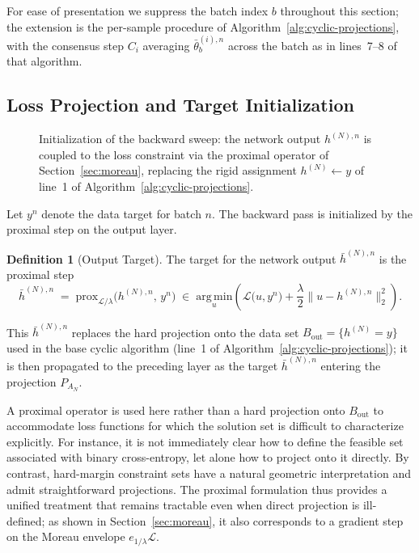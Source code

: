 \documentclass{article}
\theoremstyle{plain}
\theoremstyle{definition}
\newtheorem{definition}[theorem]{Definition}
\theoremstyle{remark}
\begin{document}
For ease of presentation we suppress the batch index $b$ throughout this section; the
extension is the per-sample procedure of Algorithm~\ref{alg:cyclic-projections}, with the
consensus step $C_i$ averaging $\bar{\theta}^{(i),n}_b$ across the batch as in
lines~7--8 of that algorithm.
 
\subsection{Loss Projection and Target Initialization}
 
\begin{figure}[htbp]
\centering
\resizebox{\textwidth}{!}{%

}
\caption{Initialization of the backward sweep: the network output $h^{(N),n}$ is coupled to
the loss constraint via the proximal operator of Section~\ref{sec:moreau}, replacing the
rigid assignment $h^{(N)} \leftarrow y$ of line~1 of Algorithm~\ref{alg:cyclic-projections}.}
\label{fig:init_back_prop}
\end{figure}
 
Let $y^{n}$ denote the data target for batch $n$. The backward pass is initialized by the
proximal step on the output layer.
 
\begin{definition}[Output Target]
\label{def:output-target}
The target for the network output $\bar{h}^{(N),n}$ is the proximal step
\begin{equation}
\bar{h}^{(N),n} \;=\; \mathrm{prox}_{\mathcal{L}/\lambda}\!\bigl(h^{(N),n},\, y^{n}\bigr)
\;\in\; \underset{u}{\mathrm{arg\,min}}
\left( \mathcal{L}\bigl(u, y^{n}\bigr) + \frac{\lambda}{2}
       \bigl\|u - h^{(N),n}\bigr\|_2^2 \right).
\end{equation}
\end{definition}
 
This $\bar{h}^{(N),n}$ replaces the hard projection onto the data set
$B_{\mathrm{out}} = \{h^{(N)} = y\}$ used in the base cyclic algorithm (line~1 of
Algorithm~\ref{alg:cyclic-projections}); it is then propagated to the preceding layer as the
target $\bar{h}^{(N),n}$ entering the projection $P_{A_{N}}$.
 
A proximal operator is used here rather than a hard projection onto $B_{\mathrm{out}}$ to
accommodate loss functions for which the solution set is difficult to characterize
explicitly. For instance, it is not immediately clear how to define the feasible set
associated with binary cross-entropy, let alone how to project onto it directly. By
contrast, hard-margin constraint sets have a natural geometric interpretation and admit
straightforward projections. The proximal formulation thus provides a unified treatment that
remains tractable even when direct projection is ill-defined; as shown in
Section~\ref{sec:moreau}, it also corresponds to a gradient step on the Moreau envelope
$e_{1/\lambda}\mathcal{L}$.
 
\end{document}
